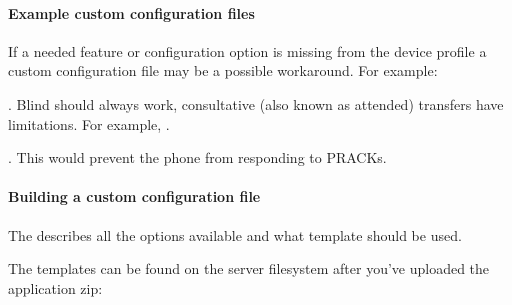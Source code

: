 \documentclass[letterpaper,10pt,english]{sphinxmanual}
\begin{document}
\paragraph{Example custom configuration files}
\label{\detokenize{webui:example-custom-configuration-files}}\label{\detokenize{webui:id41}}
If a needed feature or configuration option is missing from the device profile a custom configuration file may be a possible workaround. For example:

. Blind should always work, consultative (also known as attended) transfers have limitations. For example, .

. This would prevent the phone from responding to PRACKs.


\paragraph{Building a custom configuration file}
\label{\detokenize{webui:building-a-custom-configuration-file}}
The  describes all the options available and what template should be used.

The templates can be found on the server filesystem after you’ve uploaded the application zip:
\end{document}
